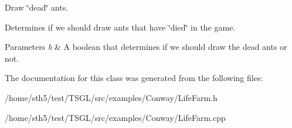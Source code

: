 Draw \char`\"{}dead\char`\"{} ants. 

Determines if we should draw ants that have \char`\"{}died\char`\"{} in the game. 
\begin{DoxyParams}{Parameters}
{\em b} & A boolean that determines if we should draw the dead ants or not. \\
\hline
\end{DoxyParams}


The documentation for this class was generated from the following files\+:\begin{DoxyCompactItemize}
\item 
/home/sth5/test/\+T\+S\+G\+L/src/examples/\+Conway/Life\+Farm.\+h\item 
/home/sth5/test/\+T\+S\+G\+L/src/examples/\+Conway/Life\+Farm.\+cpp\end{DoxyCompactItemize}
